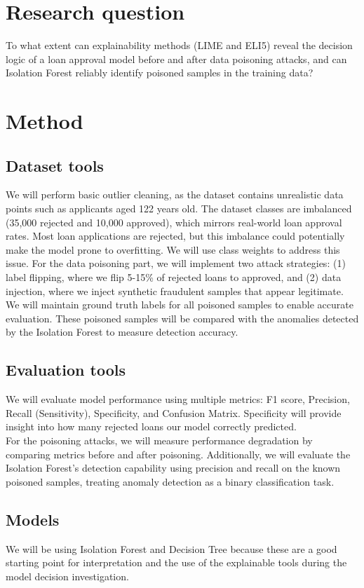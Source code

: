 \documentclass[conference]{IEEEtran}
\begin{document}
\section{Research question}
To what extent can explainability methods (LIME and ELI5) reveal the decision logic of a loan approval model before and after data poisoning attacks, and can Isolation Forest reliably identify poisoned samples in the training data?

\section{Method}
\subsection{Dataset tools}
We will perform basic outlier cleaning, as the dataset contains unrealistic data points such as applicants aged 122 years old. 
The dataset classes are imbalanced (35,000 rejected and 10,000 approved), which mirrors real-world loan approval rates. Most loan applications are rejected, but this imbalance could potentially make the model prone to overfitting. We will use class weights to address this issue.
For the data poisoning part, we will implement two attack strategies: (1) label flipping, where we flip 5-15\% of rejected loans to approved, and (2) data injection, where we inject synthetic fraudulent samples that appear legitimate. We will maintain ground truth labels for all poisoned samples to enable accurate evaluation. These poisoned samples will be compared with the anomalies detected by the Isolation Forest to measure detection accuracy. 
\subsection{Evaluation tools}
We will evaluate model performance using multiple metrics: F1 score, Precision, Recall (Sensitivity), Specificity, and Confusion Matrix.
Specificity will provide insight into how many rejected loans our model correctly predicted. \\
For the poisoning attacks, we will measure performance degradation by comparing metrics before and after poisoning. Additionally, we will evaluate the Isolation Forest's detection capability using precision and recall on the known poisoned samples, treating anomaly detection as a binary classification task.
\subsection{Models}
We will be using Isolation Forest and Decision Tree because these are a good starting point for interpretation and the use of the explainable tools during the model decision investigation.
\end{document}
